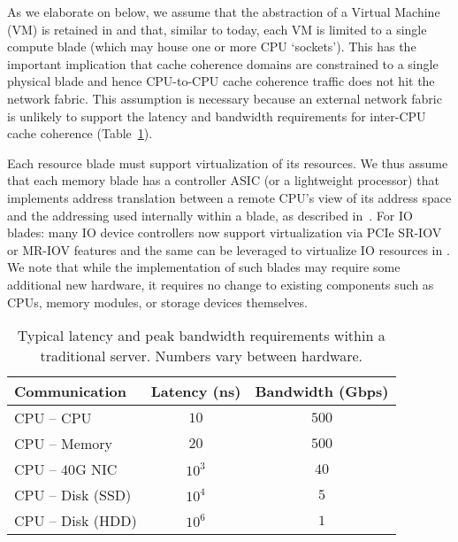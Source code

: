 As we elaborate on below, we assume that the abstraction of a Virtual Machine (VM) is retained in \dis and that, similar to today, each VM is limited to a single compute blade (which may house one or more CPU `sockets'). This has the important implication that cache coherence domains are constrained to 
a single physical blade and hence CPU-to-CPU cache coherence traffic does not hit the network fabric.
This assumption is necessary because an external network fabric is unlikely to support the latency and bandwidth requirements for inter-CPU cache coherence (Table~\ref{tab:tech}).


Each resource blade must support virtualization of its resources. 
We thus assume that each memory blade has a controller ASIC (or a lightweight processor) that implements address translation between a remote CPU's view of its address space and the addressing used internally within a blade, as described in~\cite{ddcHwDesign1}.
For IO blades: many IO device controllers now support virtualization via PCIe SR-IOV~\cite{sriov} or MR-IOV features and the same can be leveraged to virtualize IO resources in \dis. 
We note that while the implementation of such blades may require some additional new hardware, it requires no change to existing components such as CPUs, memory modules, or storage devices themselves.



%
\begin{table}
  \centering
  \small
  \begin{tabular}{l|c|c}
		\textbf{Communication} & \textbf{Latency (ns)} & \textbf{Bandwidth (Gbps)}\\\hline
	\hline
    CPU -- CPU & $10$ & $500$\\\hline
    CPU -- Memory & $20$ & $500$\\\hline
    CPU -- $40$G NIC & $10^3$ & $40$\\\hline
    CPU -- Disk (SSD) & $10^4$ & $5$\\\hline
    CPU -- Disk (HDD) & $10^6$ & $1$\\\hline
    \hline
  \end{tabular}
  \vspace{0.1in}
  \caption{\small{Typical latency and peak bandwidth requirements within a traditional server. Numbers vary between hardware.}}
  \label{tab:tech}
\end{table}
%
\vspace{-0.1in}
